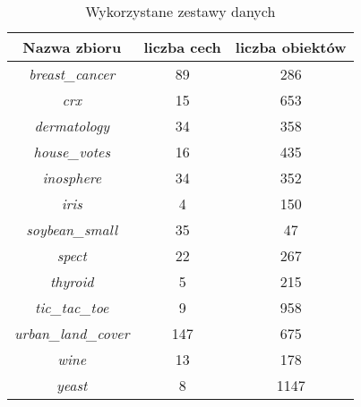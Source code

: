 \begin{table}
\caption{Wykorzystane zestawy danych}
\centering
\begin{tabular}{c || c | c}
Nazwa zbioru & liczba cech & liczba obiektów \\ \hline
\textit{breast\_cancer} 		& 89 	& 286 \\
\textit{crx} 					& 15	& 653 \\
\textit{dermatology}			& 34	& 358 \\
\textit{house\_votes}			& 16	& 435 \\
\textit{inosphere}				& 34	& 352 \\
\textit{iris}					& 4		& 150 \\
\textit{soybean\_small}			& 35	& 47  \\
\textit{spect}					& 22	& 267 \\
\textit{thyroid}				& 5		& 215 \\
\textit{tic\_tac\_toe}			& 9		& 958 \\
\textit{urban\_land\_cover}		& 147	& 675 \\
\textit{wine}					& 13	& 178 \\
\textit{yeast}					& 8		& 1147
\label{tbl:datasets}
\end{tabular}
\end{table}